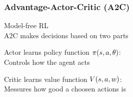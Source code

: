 \begin{frame}
    \frametitle{Advantage-Actor-Critic (A2C)}

Model-free RL\\
A2C makes decisions based on two parts
\begin{PraesentationAufzaehlung}
	\item Actor	learns policy function $\mathnormal{\pi(s, a, \theta)}$:\\
	Controls how the agent acts\\	
	\item Critic learns value function $\mathnormal{V(s, a, w)}$:\\
	Messures how good a choosen actions is\\	
\end{PraesentationAufzaehlung}



\end{frame}
\clearpage



